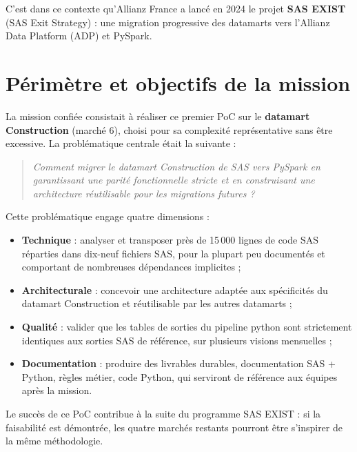 C'est dans ce contexte qu'Allianz France a lancé en 2024 le projet \textbf{SAS EXIST} (SAS Exit Strategy) : une migration progressive des datamarts vers l'Allianz Data Platform (ADP) et PySpark.

\section{Périmètre et objectifs de la mission}

La mission confiée consistait à réaliser ce premier PoC sur le \textbf{datamart Construction} (marché 6), choisi pour sa complexité représentative sans être excessive. La problématique centrale était la suivante :

\begin{quote}
    \textit{Comment migrer le datamart Construction de SAS vers PySpark en garantissant une parité fonctionnelle stricte et en construisant une architecture réutilisable pour les migrations futures ?}
\end{quote}

Cette problématique engage quatre dimensions :

\begin{itemize}
    \item \textbf{Technique} : analyser et transposer près de 15\,000 lignes de code SAS réparties dans dix-neuf fichiers SAS, pour la plupart peu documentés et comportant de nombreuses dépendances implicites ;
    \item \textbf{Architecturale} : concevoir une architecture adaptée aux spécificités du datamart Construction et réutilisable par les autres datamarts ;
    \item \textbf{Qualité} : valider que les tables de sorties du pipeline python sont strictement identiques aux sorties SAS de référence, sur plusieurs visions mensuelles ;
    \item \textbf{Documentation} : produire des livrables durables, documentation SAS + Python, règles métier, code Python, qui serviront de référence aux équipes après la mission.
\end{itemize}

Le succès de ce PoC contribue à la suite du programme SAS EXIST : si la faisabilité est démontrée, les quatre marchés restants pourront être s'inspirer de la même méthodologie.

